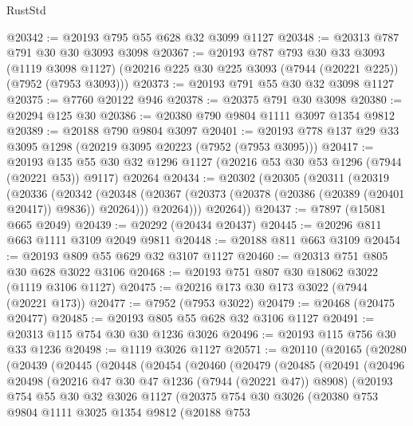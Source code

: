\begin{lexlean}{RustStd}
\begin{coremodule}
@20342 := @20193 @795 @55 @628 @32 @3099 @1127
@20348 := @20313 @787 @791 @30 @30 @3093 @3098
@20367 := @20193
    @787
    @793
    @30
    @33
    @3093
    (@1119 @3098 @1127)
    (@20216 @225 @30 @225 @3093 (@7944 (@20221 @225)) (@7952 (@7953 @3093)))
@20373 := @20193 @791 @55 @30 @32 @3098 @1127
@20375 := @7760 @20122 @946
@20378 := @20375 @791 @30 @3098
@20380 := @20294 @125 @30
@20386 := @20380 @790 @9804 @1111 @3097 @1354 @9812
@20389 := @20188 @790 @9804 @3097
@20401 := @20193 @778 @137 @29 @33 @3095 @1298 (@20219 @3095 @20223 (@7952 (@7953 @3095)))
@20417 := @20193
    @135
    @55
    @30
    @32
    @1296
    @1127
    (@20216 @53 @30 @53 @1296 (@7944 (@20221 @53)) @9117)
    @20264
@20434 := @20302
    (@20305
      (@20311
        (@20319
          (@20336
            (@20342
              (@20348 (@20367 (@20373 (@20378 (@20386 (@20389 (@20401 @20417)) @9836)) @20264)))
              @20264)))
        @20264))
@20437 := @7897 (@15081 @665 @2049)
@20439 := @20292 (@20434 @20437)
@20445 := @20296 @811 @663 @1111 @3109 @2049 @9811
@20448 := @20188 @811 @663 @3109
@20454 := @20193 @809 @55 @629 @32 @3107 @1127
@20460 := @20313 @751 @805 @30 @628 @3022 @3106
@20468 := @20193 @751 @807 @30 @18062 @3022 (@1119 @3106 @1127)
@20475 := @20216 @173 @30 @173 @3022 (@7944 (@20221 @173))
@20477 := @7952 (@7953 @3022)
@20479 := @20468 (@20475 @20477)
@20485 := @20193 @805 @55 @628 @32 @3106 @1127
@20491 := @20313 @115 @754 @30 @30 @1236 @3026
@20496 := @20193 @115 @756 @30 @33 @1236
@20498 := @1119 @3026 @1127
@20571 := @20110
    (@20165
      (@20280
        (@20439
          (@20445
            (@20448
              (@20454
                (@20460
                  (@20479
                    (@20485
                      (@20491
                        (@20496
                          @20498
                          (@20216 @47 @30 @47 @1236 (@7944 (@20221 @47)) @8908)
                          (@20193
                            @754
                            @55
                            @30
                            @32
                            @3026
                            @1127
                            (@20375
                              @754
                              @30
                              @3026
                              (@20380
                                @753
                                @9804
                                @1111
                                @3025
                                @1354
                                @9812
                                (@20188
                                  @753

\end{coremodule}
\end{lexlean}
